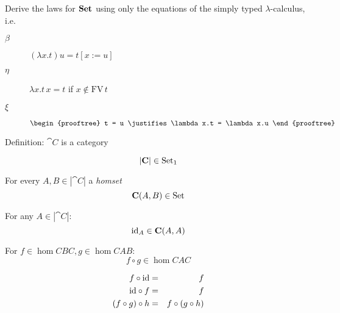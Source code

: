 \documentclass[handout]{beamer}
\newcommand{\ru}[2]{\vspace{1ex}
\begin{prooftree}
#1 \justifies #2
\end{prooftree}\vspace{1ex}}
\begin{document}
\begin{frame}
  \begin{exercise}
    Derive the laws for $\mathbf{Set}$ using only the equations of the simply
    typed $\lambda$-calculus, i.e.
    \begin{description}
    \item[$\beta$] $(\lambda x.t)u  = t[x:=u]$

    \item[$\eta$] $\lambda x.t\,x = t$ if $x\notin \mathrm{FV}\,t$

    \item[$\xi$] $\ru{t = u}{\lambda x.t = \lambda x.u}$
    \end{description}
  \end{exercise}
  
\end{frame}


\begin{frame}
  \begin{block}
    {Definition: $\cat{C}$ is a category}
    \begin{description}
    \item<+->[A (large) set of objects:] \vspace{-1ex}
      \[|\mathbf{C}| \in \mathrm{Set}_1\]

    \item<+->[Morphisms:] For every $A,B\in|\cat{C}|$ a \emph{homset}\vspace{-1ex}
      \[\mathbf{C}(A,B) \in \mathrm{Set}\]

    \item<+->[Identity:] For any $A\in|\cat{C}|$:\vspace{-1ex}
      \[\mathrm{id}_A \in \mathbf{C}(A,A)\]

    \item<+->[Composition:] For $f\in
      \hom{C}{B}{C},g\in\hom{C}{A}{B}$:\vspace{-1ex}
      \[ f \circ g \in \hom{C}{A}{C} \]
    \item<+->[Laws:]\vspace{-3ex}
      \begin{eqnarray*}
        f \circ \mathrm{id} & = & f \\
        \mathrm{id} \circ f & = & f \\
        (f \circ g) \circ h & = & f \circ (g \circ h)
      \end{eqnarray*}
    \end{description}

          
  \end{block}
  
\end{frame}
\end{document}
